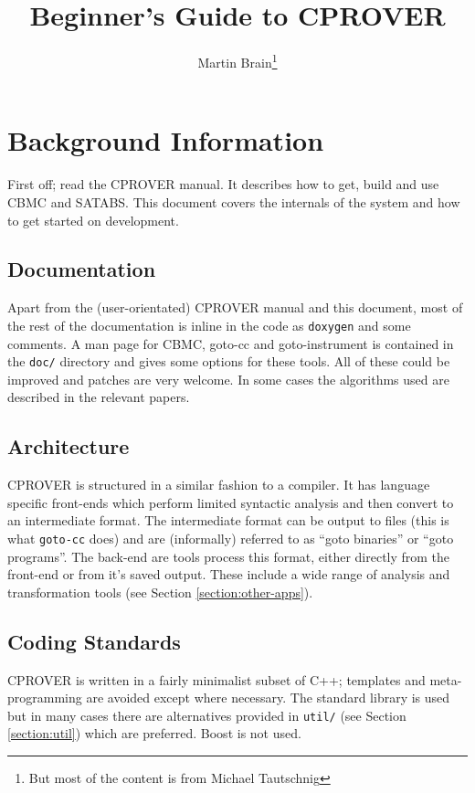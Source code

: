 \documentclass{article}
\title{Beginner's Guide to CPROVER}
\author{Martin Brain\thanks{But most of the content is from Michael Tautschnig}}
\newcommand{\dir}[1]{\texttt{#1}}
\begin{document}
\maketitle

\section{Background Information}

First off; read the CPROVER manual.  It describes how to get, build
and use CBMC and SATABS.  This document covers the internals of the
system and how to get started on development.


\subsection{Documentation}

Apart from the (user-orientated) CPROVER manual and this document,
most of the rest of the documentation is inline in the code
as \texttt{doxygen} and some comments.  A man page for CBMC, goto-cc
and goto-instrument is contained in the \dir{doc/} directory and gives
some options for these tools.  All of these could be improved
and patches are very welcome.  In some cases the algorithms used are
described in the relevant papers.

\subsection{Architecture}

CPROVER is structured in a similar fashion to a compiler.  It has
language specific front-ends which perform limited syntactic analysis
and then convert to an intermediate format.  The intermediate format
can be output to files (this is what \texttt{goto-cc} does) and are
(informally) referred to as ``goto binaries'' or ``goto programs''.
The back-end are tools process this format, either directly from the
front-end or from it's saved output.  These include a wide range of
analysis and transformation tools (see Section \ref{section:other-apps}).

\subsection{Coding Standards}

CPROVER is written in a fairly minimalist subset of C++; templates and
meta-programming are avoided except where necessary.  The standard
library is used but in many cases there are alternatives provided in
\dir{util/} (see Section \ref{section:util}) which are preferred.
Boost is not used.
\end{document}
